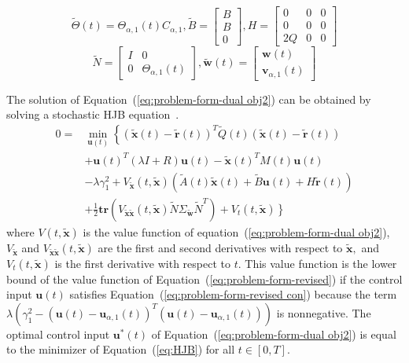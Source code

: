 \documentclass[journal]{IEEEtran}
\begin{document}
%
\begin{equation*}
    \widetilde{\Theta}(t) = \Theta_{\alpha,1}(t)C_{\alpha,1},
    \widetilde{B} = 
    \begin{bmatrix}
        B \\
        B \\
        0
    \end{bmatrix},
    H = 
    \begin{bmatrix}
        0 & 0 & 0 \\
        0 & 0 & 0 \\
        2Q & 0 & 0 
    \end{bmatrix}
\end{equation*}
%
\begin{equation*}
    \widetilde{N} = 
    \begin{bmatrix}
        I & 0 \\
        0 & \Theta_{\alpha,1}(t)
    \end{bmatrix},
    \widetilde{\mathbf{w}}(t) = 
    \begin{bmatrix}
        \mathbf{w}(t) \\
        \mathbf{v}_{\alpha,1}(t)
    \end{bmatrix}
\end{equation*}

The solution of Equation~(\ref{eq:problem-form-dual obj2}) can be obtained by solving a stochastic HJB equation~\cite{kirk2004optimal}. 
\begin{align}
\label{eq:HJB}
    0 = &\min_{\mathbf{u}(t)}{\left\{(\widetilde{\mathbf{x}}(t) - \widetilde{\mathbf{r}}(t))^T\widetilde{Q}(t)(\widetilde{\mathbf{x}}(t) - \widetilde{\mathbf{r}}(t)) \right.} \nonumber\\
    &+ \mathbf{u}(t)^{T}(\lambda I + R)\mathbf{u}(t) 
    - \widetilde{\mathbf{x}}(t)^TM(t)\mathbf{u}(t)\nonumber\\
    &- \lambda \gamma_1^2 + V_{\widetilde{\mathbf{x}}}(t,\widetilde{\mathbf{x}})(\widetilde{A}(t)\widetilde{\mathbf{x}}(t) + \widetilde{B}\mathbf{u}(t) + H\widetilde{\mathbf{r}}(t)) \nonumber\\ 
    &+ \frac{1}{2}\mathbf{tr}(V_{\widetilde{\mathbf{x}}\widetilde{\mathbf{x}}}(t,\widetilde{\mathbf{x}})\widetilde{N}\Sigma_{\widetilde{\mathbf{w}}}\widetilde{N}^T) + \left.V_{t}(t,\widetilde{\mathbf{x}})  \right\}
\end{align}
where $V(t,\widetilde{\mathbf{x}})$ is the value function of equation~(\ref{eq:problem-form-dual obj2}), $V_{\widetilde{\mathbf{x}}}$ and $V_{\widetilde{\mathbf{x}}\widetilde{\mathbf{x}}}(t,\widetilde{\mathbf{x}})$ are the first and second derivatives with respect to $\widetilde{\mathbf{x}},$ and $V_{t}(t,\widetilde{\mathbf{x}})$ is the first derivative with respect to $t.$ This value function is the lower bound of the value function of Equation~(\ref{eq:problem-form-revised}) if the control input $\mathbf{u}(t)$ satisfies Equation~(\ref{eq:problem-form-revised con}) because the term $\lambda\left(\gamma_1^2 - \left(\mathbf{u}(t) - \mathbf{u}_{\alpha,1}(t)\right)^T\left(\mathbf{u}(t) - \mathbf{u}_{\alpha,1}(t)\right)\right)$ is nonnegative. The optimal control input $\mathbf{u}^{\ast}(t)$ of Equation~(\ref{eq:problem-form-dual obj2}) is equal to the minimizer of Equation~(\ref{eq:HJB}) for all $t \in [0, T].$ 
\end{document}

